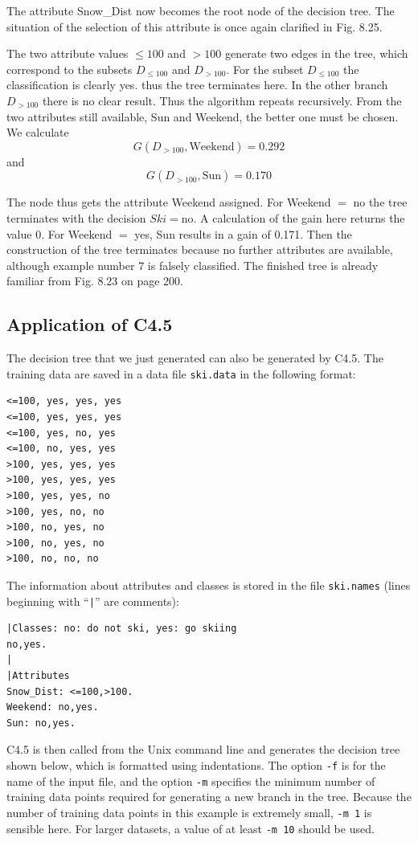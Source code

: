 \documentclass[10pt]{book}
\begin{document}
The attribute Snow\_Dist now becomes the root node of the decision tree. The situation of the selection of this attribute is once again clarified in Fig. 8.25.

The two attribute values $\leq 100$ and $>100$ generate two edges in the tree, which correspond to the subsets $D_{\leq 100}$ and $D_{>100}$. For the subset $D_{\leq 100}$ the classification is clearly yes. thus the tree terminates here. In the other branch $D_{>100}$ there is no clear result. Thus the algorithm repeats recursively. From the two attributes still available, Sun and Weekend, the better one must be chosen. We calculate
$$
G\left(D_{>100}, \text{Weekend}\right)=0.292
$$
and
$$
G\left(D_{>100}, \text{Sun}\right)=0.170
$$

The node thus gets the attribute Weekend assigned. For Weekend $=$ no the tree terminates with the decision $Ski=\text{no}$. A calculation of the gain here returns the value 0. For Weekend $=$ yes, Sun results in a gain of 0.171. Then the construction of the tree terminates because no further attributes are available, although example number 7 is falsely classified. The finished tree is already familiar from Fig. 8.23 on page 200.

\subsection{Application of C4.5}
The decision tree that we just generated can also be generated by C4.5. The training data are saved in a data file \texttt{ski.data} in the following format:

\begin{verbatim}
<=100, yes, yes, yes
<=100, yes, yes, yes
<=100, yes, no, yes
<=100, no, yes, yes
>100, yes, yes, yes
>100, yes, yes, yes
>100, yes, yes, no
>100, yes, no, no
>100, no, yes, no
>100, no, yes, no
>100, no, no, no
\end{verbatim}

The information about attributes and classes is stored in the file \texttt{ski.names} (lines beginning with ``\texttt{|}'' are comments):

\begin{verbatim}
|Classes: no: do not ski, yes: go skiing
no,yes.
|
|Attributes
Snow_Dist: <=100,>100.
Weekend: no,yes.
Sun: no,yes.
\end{verbatim}

C4.5 is then called from the Unix command line and generates the decision tree shown below, which is formatted using indentations. The option \texttt{-f} is for the name of the input file, and the option \texttt{-m} specifies the minimum number of training data points required for generating a new branch in the tree. Because the number of training data points in this example is extremely small, \texttt{-m 1} is sensible here. For larger datasets, a value of at least \texttt{-m 10} should be used.
\end{document}
